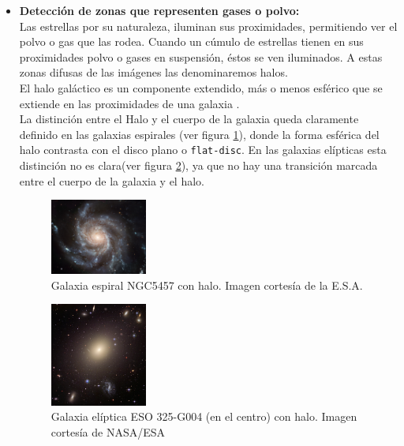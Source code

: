 \begin{itemize}
		\item \textbf{Detección de zonas que representen gases o polvo:}\\
		Las estrellas por su naturaleza, iluminan sus proximidades, permitiendo	ver el polvo o gas que las rodea. Cuando un cúmulo de estrellas tienen en sus proximidades polvo o gases en suspensión, éstos se ven iluminados. A estas zonas difusas de las imágenes las denominaremos halos.
		\\
		El halo galáctico es un componente extendido, más o menos esférico que se extiende en las proximidades de una galaxia \cite{NASADISKHALO}.
		\\
		La distinción entre el Halo y el cuerpo de la galaxia queda claramente definido en las galaxias espirales (ver figura \ref{fig:ESA_GALAXY_Espiral}), donde la forma esférica del halo contrasta con el disco plano o \texttt {flat-disc}. En las galaxias elípticas esta distinción no es clara(ver figura \ref{fig:ESO_GALAXY_Eliptica}), ya que no hay una transición marcada entre el cuerpo de la galaxia y el halo.
		\begin{figure}[!htb]
			\centering
			\includegraphics[width=0.3\textwidth]{images/Messier100_NGC5457Galaxy.jpg}
			\caption{\label{fig:ESA_GALAXY_Espiral}{\small Galaxia espiral NGC5457 con halo. Imagen cortesía de la E.S.A.}}
		\end{figure}

		\begin{figure}[!htb]
			\centering
			\includegraphics[width=0.3\textwidth]{images/ElipticalGalaxyESO325-G004.jpg}
			\caption{\label{fig:ESO_GALAXY_Eliptica}{\small Galaxia elíptica ESO 325-G004 (en el centro) con halo. Imagen cortesía de NASA/ESA} }
		\end{figure}


\end{itemize}
